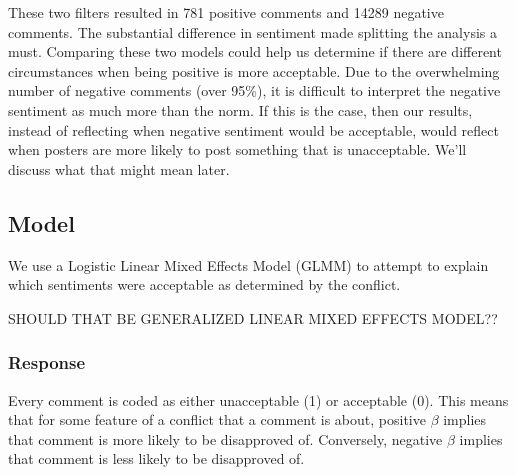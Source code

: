 These two filters resulted in 781 positive comments and 14289 negative comments. The substantial difference in sentiment made splitting the analysis a must. Comparing these two models could help us determine if there are different circumstances when being positive is more acceptable. Due to the overwhelming number of negative comments (over 95\%), it is difficult to interpret the negative sentiment as much more than the norm. If this is the case, then our results, instead of reflecting when negative sentiment would be acceptable, would reflect when posters are more likely to post something that is unacceptable. We'll discuss what that might mean later.

\subsection{Model}
We use a Logistic Linear Mixed Effects Model (GLMM) to attempt to explain which sentiments were acceptable as determined by the conflict.

SHOULD THAT BE GENERALIZED LINEAR MIXED EFFECTS MODEL??

\subsubsection{Response}
Every comment is coded as either unacceptable (1) or acceptable (0). This means that for some feature of a conflict that a comment is about, positive $\beta$ implies that comment is more likely to be disapproved of. Conversely, negative $\beta$ implies that comment is less likely to be disapproved of. 

